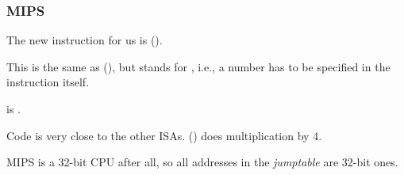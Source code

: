 \subsubsection{MIPS}




The new instruction for us is  ().

This is the same as  (), but  stands for , 
i.e., a number has to be specified in the instruction itself.

 is .

Code is very close to the other \ac{ISA}s.
 () does multiplication by 4.

MIPS is a 32-bit CPU after all, so all addresses in the \emph{jumptable} are 32-bit ones.

